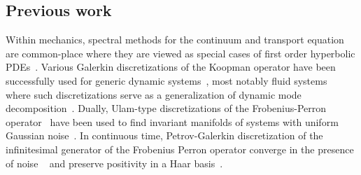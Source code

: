 \documentclass[final,leqno]{siamart}
\begin{document}
\subsection{Previous work}
Within mechanics, spectral methods for the continuum and transport equation are common-place where they are viewed as special cases of first order hyperbolic PDEs~\cite{Gottlieb2001}.
Various Galerkin discretizations of the Koopman operator have been successfully used for generic dynamic systems~\cite{BudisicMohrMezic2012,Mezic2005}, most notably fluid systems~\cite{Rowley2009} where such discretizations serve as a generalization of dynamic mode decomposition~\cite{Schmid2010}.
Dually, Ulam-type discretizations of the Frobenius-Perron operator~\cite{LasotaMackey1994,Ulam1947} have been used to find invariant manifolds of systems with uniform Gaussian noise~\cite{FroylandJungeKoltai2013,FroylandPadberg2009}.
In continuous time, Petrov-Galerkin discretization of the infinitesimal generator of the Frobenius Perron operator converge in the presence of noise ~\cite{BittracherKoltaiJunge2015} and preserve positivity in a Haar basis~\cite{koltai2011thesis}.

\end{document}
